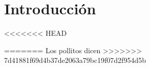\section*{Introducción}

\lipsum[2]
<<<<<<< HEAD

\cite{medina1010}
=======
Los pollitos dicen
>>>>>>> 7d41881f69d4b37de2063a79bc19f07d2f954d5b
